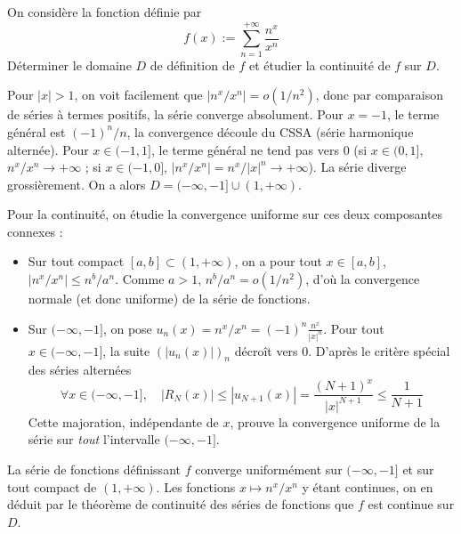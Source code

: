 \begin{exo}
    \label{seriesfonc3}
    On considère la fonction définie par 
    \[f(x):=\sum_{n=1}^{+\infty}\frac{n^x}{x^n}\]
    Déterminer le domaine $D$ de définition de $f$ et étudier la continuité de $f$ sur $D$.
\end{exo}

\begin{solution}
    Pour $|x|>1$, on voit facilement que $|n^x/x^n|=o(1/n^2)$, donc par comparaison de séries à termes positifs, la série converge absolument.
    Pour $x=-1$, le terme général est $(-1)^n/n$, la convergence découle du CSSA (série harmonique alternée).
    Pour $x\in(-1,1]$, le terme général ne tend pas vers $0$ (si $x \in (0,1]$, $n^x/x^n \to +\infty$ ; si $x \in (-1,0]$, $|n^x/x^n| = n^x/|x|^n \to +\infty$). La série diverge grossièrement.
    On a alors $D=(-\infty,-1]\cup(1,+\infty)$.
    
    Pour la continuité, on étudie la convergence uniforme sur ces deux composantes connexes :
    \begin{itemize}
        \item Sur tout compact $[a,b] \subset (1,+\infty)$, on a pour tout $x \in [a,b]$, $|n^x/x^n| \leq n^b/a^n$. Comme $a>1$, $n^b/a^n = o(1/n^2)$, d'où la convergence normale (et donc uniforme) de la série de fonctions.
        \item Sur $(-\infty,-1]$, on pose $u_n(x) = n^x/x^n = (-1)^n \frac{n^x}{|x|^n}$. Pour tout $x \in (-\infty,-1]$, la suite $(|u_n(x)|)_n$ décroît vers $0$. D'après le critère spécial des séries alternées
        \[
            \forall x \in (-\infty,-1], \quad |R_N(x)| \leq |u_{N+1}(x)| = \frac{(N+1)^x}{|x|^{N+1}} \leq \frac{1}{N+1}
        \]
        Cette majoration, indépendante de $x$, prouve la convergence uniforme de la série sur \textit{tout} l'intervalle $(-\infty,-1]$.
    \end{itemize}
    La série de fonctions définissant $f$ converge uniformément sur $(-\infty, -1]$ et sur tout compact de $(1,+\infty)$. Les fonctions $x \mapsto n^x/x^n$ y étant continues, on en déduit par le théorème de continuité des séries de fonctions que $f$ est continue sur $D$.
\end{solution}